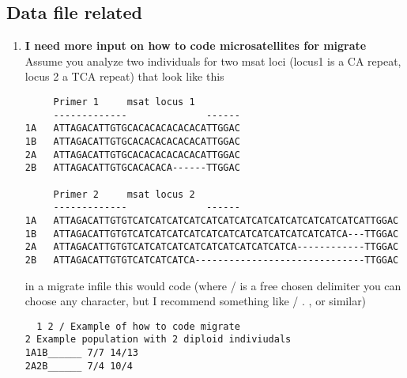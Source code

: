 \subsection{Data file related}
\begin{enumerate}
\item{\bf I need more input on how to code microsatellites for migrate}
Assume you analyze two individuals for two msat loci (locus1 is a CA repeat,
locus 2 a TCA repeat) that look like this
\begin{tt}
\begin{verbatim}
     Primer 1     msat locus 1  
     -------------              ------
1A   ATTAGACATTGTGCACACACACACACATTGGAC
1B   ATTAGACATTGTGCACACACACACACATTGGAC
2A   ATTAGACATTGTGCACACACACACACATTGGAC
2B   ATTAGACATTGTGCACACACA------TTGGAC

     Primer 2     msat locus 2 
     -------------              ------
1A   ATTAGACATTGTGTCATCATCATCATCATCATCATCATCATCATCATCATCATCATTGGAC
1B   ATTAGACATTGTGTCATCATCATCATCATCATCATCATCATCATCATCATCA---TTGGAC
2A   ATTAGACATTGTGTCATCATCATCATCATCATCATCATCATCA------------TTGGAC
2B   ATTAGACATTGTGTCATCATCATCA------------------------------TTGGAC
\end{verbatim}
\end{tt}
in a migrate infile this would code (where / is a free chosen delimiter
you can choose any character, but I recommend something like / . , or similar)
\begin{tt}
\begin{verbatim}
  1 2 / Example of how to code migrate
2 Example population with 2 diploid indiviudals
1A1B______ 7/7 14/13
2A2B______ 7/4 10/4 
\end{verbatim}
\end{tt}


\end{enumerate}
